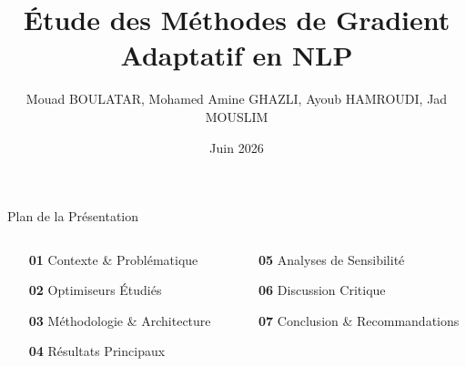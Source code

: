 \documentclass[10pt, aspectratio=169]{beamer}
\title[Optimisation NLP]{Étude des Méthodes de Gradient Adaptatif en NLP}
\author[M. BOULATAR \& M. A. GHAZLI]{Mouad BOULATAR, Mohamed Amine GHAZLI, Ayoub HAMROUDI, Jad MOUSLIM}
\institute[FSBM]{Faculté des Sciences Ben M'sik}
\date[Juin 2026]{Juin 2026}
\begin{document}
\begin{frame}[plain]
    \titlepage
\end{frame}
\begin{frame}{Plan de la Présentation}
    \vspace{0.2cm}
    \begin{columns}[t]
        \begin{column}{0.48\textwidth}
            \begin{itemize}
                \setlength{\itemsep}{12pt}
                \item[\color{StartupCyan}\bfseries 01] Contexte \& Problématique
                \item[\color{StartupCyan}\bfseries 02] Optimiseurs Étudiés
                \item[\color{StartupCyan}\bfseries 03] Méthodologie \& Architecture
                \item[\color{StartupCyan}\bfseries 04] Résultats Principaux
            \end{itemize}
        \end{column}

        \begin{column}{0.48\textwidth}
            \begin{itemize}
                \setlength{\itemsep}{12pt}
                \item[\color{StartupCyan}\bfseries 05] Analyses de Sensibilité
                \item[\color{StartupCyan}\bfseries 06] Discussion Critique
                \item[\color{StartupCyan}\bfseries 07] Conclusion \& Recommandations
            \end{itemize}
        \end{column}
    \end{columns}
\end{frame}

\end{document}
